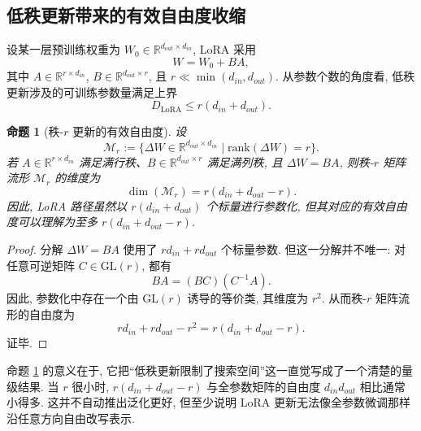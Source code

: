 \documentclass[a4paper,punct=banjiao,twoside]{ctexrep}
\theoremstyle{plain}
\newtheorem{prop}[thm]{命题}
\theoremstyle{definition}
\theoremstyle{remark}
\begin{document}
\subsection{低秩更新带来的有效自由度收缩}

设某一层预训练权重为 $W_0 \in \mathbb{R}^{d_{out}\times d_{in}}$, LoRA 采用
\begin{equation}
    W = W_0 + BA,
\end{equation}
其中 $A \in \mathbb{R}^{r\times d_{in}}$, $B \in \mathbb{R}^{d_{out}\times r}$, 且 $r \ll \min(d_{in}, d_{out})$. 从参数个数的角度看, 低秩更新涉及的可训练参数量满足上界
\begin{equation}
    D_{\text{LoRA}} \le r(d_{in}+d_{out}).
\end{equation}

\begin{prop}[秩-$r$ 更新的有效自由度]
\label{prop:lora_effective_dimension}
设
\begin{equation}
    \mathcal{M}_r := \{\Delta W \in \mathbb{R}^{d_{out}\times d_{in}} \mid \mathrm{rank}(\Delta W)=r\}.
\end{equation}
若 $A \in \mathbb{R}^{r\times d_{in}}$ 满足满行秩、$B \in \mathbb{R}^{d_{out}\times r}$ 满足满列秩, 且 $\Delta W = BA$, 则秩-$r$ 矩阵流形 $\mathcal{M}_r$ 的维度为
\begin{equation}
    \dim(\mathcal{M}_r) = r(d_{in}+d_{out}-r).
\end{equation}
因此, LoRA 路径虽然以 $r(d_{in}+d_{out})$ 个标量进行参数化, 但其对应的有效自由度可以理解为至多 $r(d_{in}+d_{out}-r)$.
\end{prop}

\begin{proof}
分解 $\Delta W = BA$ 使用了 $r d_{in} + r d_{out}$ 个标量参数. 但这一分解并不唯一: 对任意可逆矩阵 $C \in \mathrm{GL}(r)$, 都有
\begin{equation}
    BA = (BC)(C^{-1}A).
\end{equation}
因此, 参数化中存在一个由 $\mathrm{GL}(r)$ 诱导的等价类, 其维度为 $r^2$. 从而秩-$r$ 矩阵流形的自由度为
\begin{equation}
    r d_{in} + r d_{out} - r^2 = r(d_{in}+d_{out}-r).
\end{equation}
证毕.
\end{proof}

命题 \ref{prop:lora_effective_dimension} 的意义在于, 它把“低秩更新限制了搜索空间”这一直觉写成了一个清楚的量级结果. 当 $r$ 很小时, $r(d_{in}+d_{out}-r)$ 与全参数矩阵的自由度 $d_{in}d_{out}$ 相比通常小得多. 这并不自动推出泛化更好, 但至少说明 LoRA 更新无法像全参数微调那样沿任意方向自由改写表示.
\end{document}
